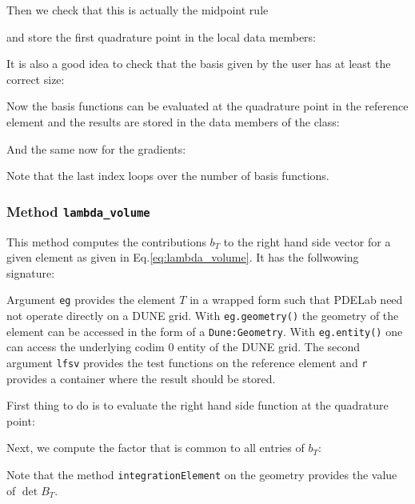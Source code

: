 \documentclass[a4paper,12pt]{article}
\begin{document}
Then we check that this is actually the midpoint rule

and store the first quadrature point in the local data members:

It is also a good idea to check that the basis given by the user
has at least the correct size:

Now the basis functions can be evaluated at the quadrature
point in the reference element and the results are stored in the 
data members of the class:

And the same now for the gradients:

Note that the last index loops over the number of basis
functions. 

\subsubsection*{Method \lstinline{lambda_volume}}

This method computes the contributions $b_T$ to the right hand side 
vector for a given element as given in Eq.\eqref{eq:lambda_volume}.
It has the follwowing signature:

Argument \lstinline{eg} provides the element $T$ in
a wrapped form such that PDELab need not operate directly on a DUNE grid.
With \lstinline{eg.geometry()} the geometry of the element can be accessed
in the form of a \lstinline{Dune:Geometry}. With \lstinline{eg.entity()} one can
access the underlying codim 0 entity of the DUNE grid.
The second argument \lstinline{lfsv} provides the test functions on the reference
element and \lstinline{r} provides a container where the result should be stored.

First thing to do is to evaluate the right hand side function at the quadrature
point:


Next, we compute the factor that is common to all entries of $b_T$:

Note that the method \lstinline{integrationElement} on the geometry
provides the value of $\det B_T$.
\end{document}
